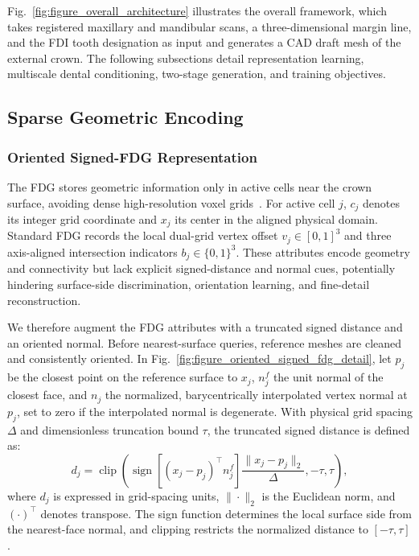 \documentclass[preprint,review,12pt]{elsarticle}
\begin{document}
\hspace{2em}Fig.~\ref{fig:figure_overall_architecture} illustrates the overall framework, which takes registered maxillary and mandibular scans, a three-dimensional margin line, and the FDI tooth designation as input and generates a CAD draft mesh of the external crown. The following subsections detail representation learning, multiscale dental conditioning, two-stage generation, and training objectives.

\subsection{Sparse Geometric Encoding}\label{subsec3_2}

\subsubsection{Oriented Signed-FDG Representation}\label{subsubsec3_2_1}

\hspace{2em}The FDG stores geometric information only in active cells near the crown surface, avoiding dense high-resolution voxel grids~\cite{xiang2026native}. For active cell \(j\), \(c_j\) denotes its integer grid coordinate and \(x_j\) its center in the aligned physical domain. Standard FDG records the local dual-grid vertex offset \(v_j\in[0,1]^3\) and three axis-aligned intersection indicators \(b_j\in\{0,1\}^3\). These attributes encode geometry and connectivity but lack explicit signed-distance and normal cues, potentially hindering surface-side discrimination, orientation learning, and fine-detail reconstruction.

\hspace{2em}We therefore augment the FDG attributes with a truncated signed distance and an oriented normal. Before nearest-surface queries, reference meshes are cleaned and consistently oriented. In Fig.~\ref{fig:figure_oriented_signed_fdg_detail}, let \(p_j\) be the closest point on the reference surface to \(x_j\), \(n_j^f\) the unit normal of the closest face, and \(n_j\) the normalized, barycentrically interpolated vertex normal at \(p_j\), set to zero if the interpolated normal is degenerate. With physical grid spacing \(\Delta\) and dimensionless truncation bound \(\tau\), the truncated signed distance is defined as:
\begin{equation}
d_j=\operatorname{clip}\!\left(
\operatorname{sign}\!\left[(x_j-p_j)^\top n_j^f\right]
\frac{\|x_j-p_j\|_2}{\Delta},-\tau,\tau
\right),\label{eq:oriented_signed_distance}
\end{equation}
where \(d_j\) is expressed in grid-spacing units, \(\|\cdot\|_2\) is the Euclidean norm, and \((\cdot)^\top\) denotes transpose. The sign function determines the local surface side from the nearest-face normal, and clipping restricts the normalized distance to \([-\tau,\tau]\).
\end{document}
